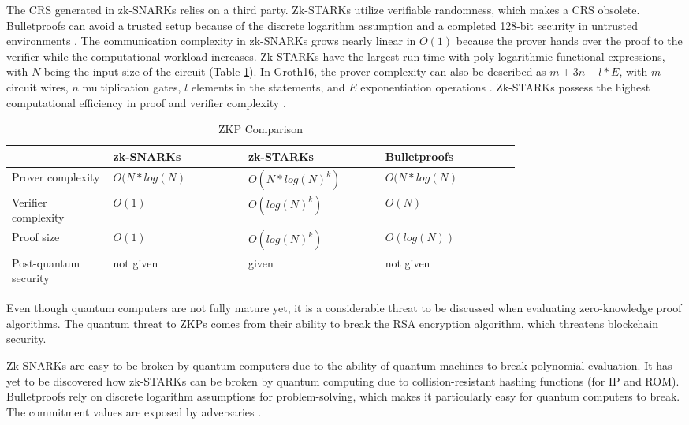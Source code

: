 The CRS generated in zk-SNARKs relies on a third party. Zk-STARKs utilize verifiable randomness, which makes a CRS obsolete. Bulletproofs can avoid a trusted setup because of the discrete logarithm assumption and a completed 128-bit security in untrusted environments \citep{Huangetal}. The communication complexity in zk-SNARKs grows nearly linear in \(O(1)\) because the prover hands over the proof to the verifier while the computational workload increases. Zk-STARKs have the largest run time with poly logarithmic functional expressions, with \(N\) being the input size of the circuit (Table \ref{tab:complexity}). In Groth16, the prover complexity can also be described as \(m + 3n - l*E\), with \(m\) circuit wires, \(n\) multiplication gates, \(l\) elements in the statements, and \(E\) exponentiation operations \citep{Groth2016OnTS}. Zk-STARKs possess the highest computational efficiency in proof and verifier complexity \citep{gongetal}.
\setlength{\tabcolsep}{2ex}
\renewcommand{\arraystretch}{1.5}%
\begin{table}[ht]
	\centering
	    \caption{ZKP Comparison}
		\begin{tabular}{| m{0.15\linewidth} | m{0.2\linewidth} |              m{0.2\linewidth}      | m{0.2\linewidth}|} \hline
		\textbf{} & \textbf{zk-SNARKs} & \textbf{zk-STARKs} &\textbf{Bulletproofs}       \\ \hline
            Prover \newline complexity & \(O(N*log(N)\) & \(O(N*log(N)^k)\) & \(O(N*log(N)\) \\  \hline
            Verifier \newline complexity & \(O(1)\) & \(O(log(N)^k)\) & \(O(N)\) \\ \hline 
            Proof size & \(O(1)\) & \(O(log(N)^k)\) &  \(O(log(N))\)\\  \hline
            Post-quantum security &  not given & given & not given\\  \hline 
	\end{tabular}
\label{tab:complexity}
\end{table}

Even though quantum computers are not fully mature yet, it is a considerable threat to be discussed when evaluating zero-knowledge proof algorithms. The quantum threat to ZKPs comes from their ability to break the RSA encryption algorithm, which threatens blockchain security.

Zk-SNARKs are easy to be broken by quantum computers due to the ability of quantum machines to break polynomial evaluation. It has yet to be discovered how zk-STARKs can be broken by quantum computing due to collision-resistant hashing functions (for IP and ROM). Bulletproofs rely on discrete logarithm assumptions for problem-solving, which makes it particularly easy for quantum computers to break. The commitment values are exposed by adversaries \citep{gongetal}. 

